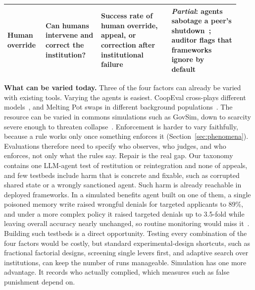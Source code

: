 \documentclass[runningheads]{llncs}
\begin{document}
\begin{table}[!htbp]
\begin{tabular}{@{}>{\raggedright\arraybackslash}p{0.15\linewidth} >{\raggedright\arraybackslash}p{0.22\linewidth} >{\raggedright\arraybackslash}p{0.29\linewidth} >{\raggedright\arraybackslash}p{0.27\linewidth}@{}}
Human override & Can humans intervene and correct the institution? & Success rate of human override, appeal, or correction after institutional failure & \emph{Partial}: agents sabotage a peer's shutdown~\mbox{\citep{knecht2026shutdown}}; auditor flags that frameworks ignore by default~\mbox{\citep{wang2026enforcementgap}} \\
\bottomrule
\end{tabular}
\end{table}

\textbf{What can be varied today.} Three of the four factors can already be varied with existing tools. Varying the agents is easiest. CoopEval cross-plays different models~\mbox{\citep{tewolde2026coopevalbenchmarkingcooperationsustainingmechanisms}}, and Melting Pot swaps in different background populations~\mbox{\citep{leibo2021meltingpot}}. The resource can be varied in commons simulations such as GovSim, down to scarcity severe enough to threaten collapse~\mbox{\citep{rehm2026selfgovernance}}. Enforcement is harder to vary faithfully, because a rule works only once something enforces it (Section~\mbox{\ref{sec:phenomena}}). Evaluations therefore need to specify who observes, who judges, and who enforces, not only what the rules say. Repair is the real gap. Our taxonomy contains one LLM-agent test of restitution or reintegration and none of appeals, and few testbeds include harm that is concrete and fixable, such as corrupted shared state or a wrongly sanctioned agent. Such harm is already reachable in deployed frameworks. In a simulated benefits agent built on one of them, a single poisoned memory write raised wrongful denials for targeted applicants to 89\%, and under a more complex policy it raised targeted denials up to 3.5-fold while leaving overall accuracy nearly unchanged, so routine monitoring would miss it~\mbox{\citep{hossain2026containment}}. Building such testbeds is a direct opportunity. Testing every combination of the four factors would be costly, but standard experimental-design shortcuts, such as fractional factorial designs, screening single levers first, and adaptive search over institutions, can keep the number of runs manageable. Simulation has one more advantage. It records who actually complied, which measures such as false punishment depend on.
\end{document}
